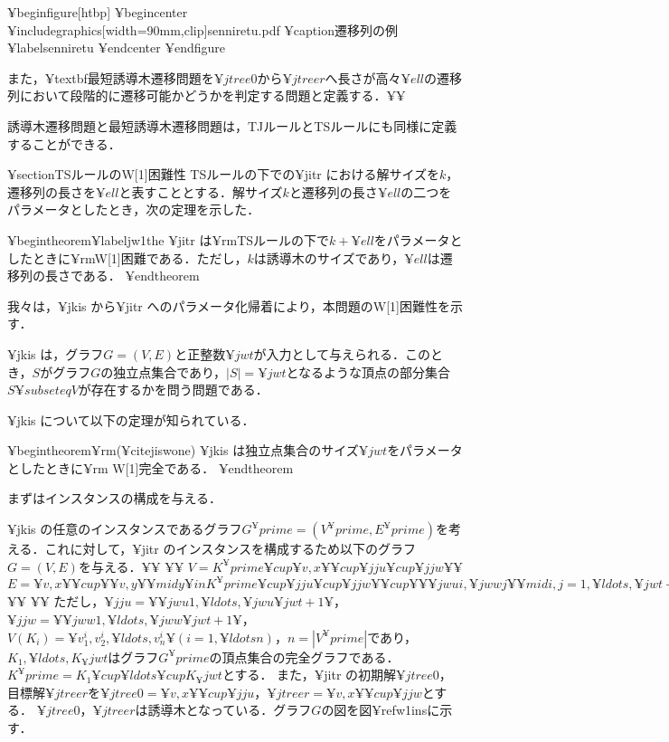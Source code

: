 ¥begin{figure}[htbp]
	¥begin{center}
		¥includegraphics[width=90mm,clip]{senniretu.pdf}
		¥caption{遷移列の例}
		¥label{senniretu}
	¥end{center}
¥end{figure}

また，¥textbf{最短誘導木遷移問題}を$¥jtree{0}$から$¥jtree{r}$へ長さが高々$¥ell$の遷移列において段階的に遷移可能かどうかを判定する問題と定義する．¥¥

誘導木遷移問題と最短誘導木遷移問題は，TJルールとTSルールにも同様に定義することができる．


¥section{TSルールのW[1]困難性}
TSルールの下での¥jitr における解サイズを$k$，遷移列の長さを$¥ell$と表すこととする．解サイズ$k$と遷移列の長さ$¥ell$の二つをパラメータとしたとき，次の定理を示した．




¥begin{theorem}¥label{jw1the}
	¥jitr は¥rm{TS}ルールの下で$k+¥ell$をパラメータとしたときに¥rm{W[1]}困難である．ただし，$k$は誘導木のサイズであり，$¥ell$は遷移列の長さである．
¥end{theorem}

我々は，¥jkis から¥jitr へのパラメータ化帰着により，本問題のW[1]困難性を示す．

¥jkis は，グラフ$G=(V,E)$と正整数$¥jwt$が入力として与えられる．このとき，$S$がグラフ$G$の独立点集合であり，$|S|=¥jwt$となるような頂点の部分集合$S¥subseteq V$が存在するかを問う問題である．

¥jkis について以下の定理が知られている．

¥begin{theorem}¥rm{(¥cite{jiswone})}
	¥jkis は独立点集合のサイズ$¥jwt$をパラメータとしたときに{¥rm W[1]}完全である．
¥end{theorem}

まずはインスタンスの構成を与える．

¥jkis の任意のインスタンスであるグラフ$G^¥prime=(V^¥prime,E^¥prime)$を考える．これに対して，¥jitr のインスタンスを構成するため以下のグラフ$G=(V,E)$を与える．¥¥
¥¥
$V=K^¥prime ¥cup ¥{v,x¥}¥cup ¥jju ¥cup ¥jjw$¥¥
$E=¥{v,x¥}¥cup
 ¥{¥{v,y¥}¥mid y¥in K^¥prime ¥cup ¥jju ¥cup ¥jjw ¥}¥cup 
 ¥{¥{¥jwu{i},¥jww{j}¥}¥mid i,j=1,¥ldots,¥jwt+1¥}¥cup 
 ¥{¥{v_x^i,v_y^j¥},¥{v_y^i,v_x^j¥}¥mid  i,j=1,¥ldots,¥jwt¥,i¥neq j,x,y=1,¥ldots,n,¥{v_x,v_y¥}¥in E^¥prime¥}¥cup 
 ¥{¥{v_a^i,v_a^j¥}¥mid i,j=1,¥ldots,¥jwt,i¥neq j,a=1,¥ldots,n¥}$¥¥
¥¥
ただし，$¥jju=¥{¥jwu{1},¥ldots,¥jwu{¥jwt+1}¥}$，$¥jjw=¥{¥jww{1},¥ldots,¥jww{¥jwt+1}¥}$，$V(K_i)=¥{v_1^i,v_2^i,¥ldots,v_n^i¥}(i=1,¥ldots n)$，$n=|V^¥prime|$であり，$K_1,¥ldots,K_¥jwt$はグラフ$G^¥prime$の頂点集合の完全グラフである．
$K^¥prime = K_1¥cup ¥ldots ¥cup K_¥jwt$とする．
また，¥jitr の初期解$¥jtree{0}$，目標解$¥jtree{r}$を$¥jtree{0}=¥{v,x¥}¥cup ¥jju$，$¥jtree{r}=¥{v,x¥}¥cup ¥jjw$とする．
$¥jtree{0}$，$¥jtree{r}$は誘導木となっている．グラフ$G$の図を図¥ref{w1ins}に示す．

